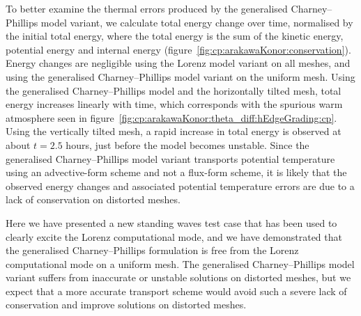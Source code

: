 To better examine the thermal errors produced by the generalised Charney--Phillips model variant, we calculate total energy change over time, normalised by the initial total energy, where the total energy is the sum of the kinetic energy, potential energy and internal energy (figure~\ref{fig:cp:arakawaKonor:conservation}).
Energy changes are negligible using the Lorenz model variant on all meshes, and using the generalised Charney--Phillips model variant on the uniform mesh.
Using the generalised Charney--Phillips model and the horizontally tilted mesh, total energy increases linearly with time, which corresponds with the spurious warm atmosphere seen in figure~\ref{fig:cp:arakawaKonor:theta_diff:hEdgeGrading:cp}.
Using the vertically tilted mesh, a rapid increase in total energy is observed at about $t=2.5$ hours, just before the model becomes unstable.
Since the generalised Charney--Phillips model variant transports potential temperature using an advective-form scheme and not a flux-form scheme, it is likely that the observed energy changes and associated potential temperature errors are due to a lack of conservation on distorted meshes.

Here we have presented a new standing waves test case that has been used to clearly excite the Lorenz computational mode, and we have demonstrated that the generalised Charney--Phillips formulation is free from the Lorenz computational mode on a uniform mesh.
The generalised Charney--Phillips model variant suffers from inaccurate or unstable solutions on distorted meshes, but we expect that a more accurate transport scheme would avoid such a severe lack of conservation and improve solutions on distorted meshes.
